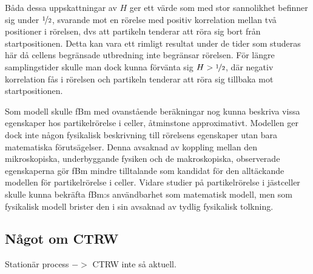 Båda dessa uppskattningar av $H$ ger ett värde som med stor sannolikhet befinner sig under $\nicefrac{1}{2}$, svarande mot en rörelse med positiv korrelation mellan två positioner i rörelsen, dvs att partikeln tenderar att röra sig bort från startpositionen. Detta kan vara ett rimligt resultat under de tider som studeras här då cellens begränsade utbredning inte begränsar rörelsen. För längre samplingstider skulle man dock kunna förvänta sig $H>\nicefrac{1}{2}$, där negativ korrelation fås i rörelsen och partikeln tenderar att röra sig tillbaka mot startpositionen. 

Som modell skulle fBm med ovanstående beräkningar nog kunna beskriva vissa egenskaper hos partikelrörelse i celler, åtminstone approximativt. Modellen ger dock inte någon fysikalisk beskrivning till rörelsens egenskaper utan bara matematiska förutsägelser. Denna avsaknad av koppling mellan den mikroskopiska, underbyggande fysiken och de makroskopiska, observerade egenskaperna gör fBm mindre tilltalande som kandidat för den alltäckande modellen för partikelrörelse i celler. Vidare studier på partikelrörelse i jästceller skulle kunna bekräfta fBm:s användbarhet som matematisk modell, men som fysikalisk modell brister den i sin avsaknad av tydlig fysikalisk tolkning.

\subsection{Något om CTRW}
Stationär process $->$ CTRW inte så aktuell.



